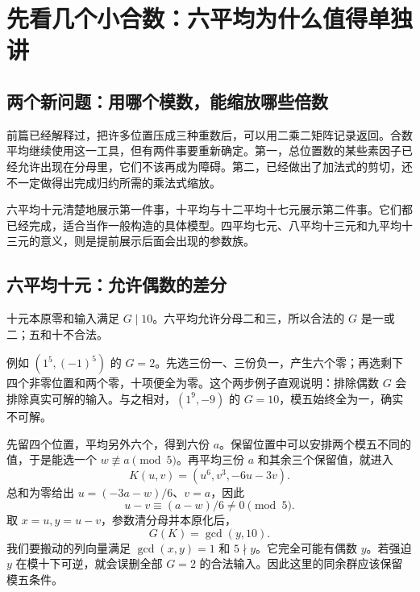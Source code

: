 \chapter{先看几个小合数：六平均为什么值得单独讲}\label{ch:small}
\section{两个新问题：用哪个模数，能缩放哪些倍数}
前篇已经解释过，把许多位置压成三种重数后，可以用二乘二矩阵记录返回。合数平均继续使用这一工具，但有两件事要重新确定。第一，总位置数的某些素因子已经允许出现在分母里，它们不该再成为障碍。第二，已经做出了加法式的剪切，还不一定做得出完成归约所需的乘法式缩放。

六平均十元清楚地展示第一件事，十平均与十二平均十七元展示第二件事。它们都已经完成，适合当作一般构造的具体模型。四平均七元、八平均十三元和九平均十三元的意义，则是提前展示后面会出现的参数族。

\section{六平均十元：允许偶数的差分}
十元本原零和输入满足 $G\mid10$。六平均允许分母二和三，所以合法的 $G$ 是一或二；五和十不合法。

例如 $(1^5,(-1)^5)$ 的 $G=2$。先选三份一、三份负一，产生六个零；再选剩下四个非零位置和两个零，十项便全为零。这个两步例子直观说明：排除偶数 $G$ 会排除真实可解的输入。与之相对，$(1^9,-9)$ 的 $G=10$，模五始终全为一，确实不可解。

先留四个位置，平均另外六个，得到六份 $a$。保留位置中可以安排两个模五不同的值，于是能选一个 $w\not\equiv a\pmod5$。再平均三份 $a$ 和其余三个保留值，就进入
\[
K(u,v)=(u^6,v^3,-6u-3v).
\]
总和为零给出 $u=(-3a-w)/6$、$v=a$，因此
\[u-v\equiv(a-w)/6\ne0\pmod5.
\]
取 $x=u,y=u-v$，参数清分母并本原化后，
\[G(K)=\gcd(y,10).
\]
我们要搬动的列向量满足 $\gcd(x,y)=1$ 和 $5\nmid y$。它完全可能有偶数 $y$。若强迫 $y$ 在模十下可逆，就会误删全部 $G=2$ 的合法输入。因此这里的同余群应该保留模五条件。

